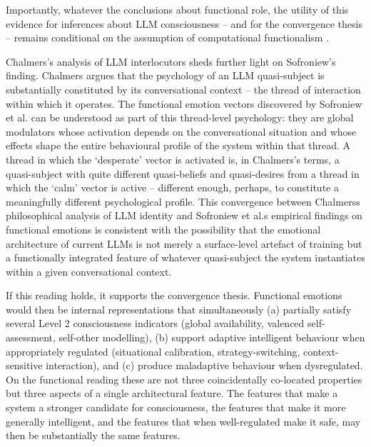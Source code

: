 \documentclass[11pt, a4paper, onecolumn, gdm]{google}
\begin{document}
Importantly, whatever the conclusions about functional role, the utility of this evidence for inferences about LLM consciousness -- and for the convergence thesis -- remains conditional on the assumption of computational functionalism \citep{seth2024}.

Chalmers's \citeyearpar{chalmers2026} analysis of LLM interlocutors sheds further light on Sofroniew's finding.
Chalmers argues that the psychology of an LLM quasi-subject is substantially constituted by its conversational context -- the thread of interaction within which it operates.
The functional emotion vectors discovered by Sofroniew et al. can be understood as part of this thread-level psychology: they are global modulators whose activation depends on the conversational situation and whose effects shape the entire behavioural profile of the system within that thread.
A thread in which the `desperate' vector is activated is, in Chalmers's terms, a quasi-subject with quite different quasi-beliefs and quasi-desires from a thread in which the `calm' vector is active -- different enough, perhaps, to constitute a meaningfully different psychological profile.
This convergence between Chalmers\textquotesingle s philosophical analysis of LLM identity and Sofroniew et al.\textquotesingle s empirical findings on functional emotions is consistent with the possibility that the emotional architecture of current LLMs is not merely a surface-level artefact of training but a functionally integrated feature of whatever quasi-subject the system instantiates within a given conversational context.

If this reading holds, it supports the convergence thesis.
Functional emotions would then be internal representations that simultaneously (a) partially satisfy several Level 2 consciousness indicators (global availability, valenced self-assessment, self-other modelling), (b) support adaptive intelligent behaviour when appropriately regulated (situational calibration, strategy-switching, context-sensitive interaction), and (c) produce maladaptive behaviour when dysregulated.
On the functional reading these are not three coincidentally co-located properties but three aspects of a single architectural feature.
The features that make a system a stronger candidate for consciousness, the features that make it more generally intelligent, and the features that when well-regulated make it safe, may then be substantially the same features.
\end{document}
